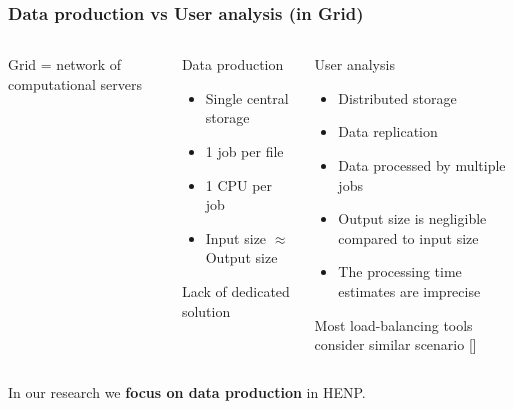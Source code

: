 \documentclass{beamer}
\begin{document}
\begin{frame}\frametitle{Data production vs User analysis (in Grid)}
\begin{columns}[c]
\begin{block}{}
Grid = network of computational servers
\end{block}

\begin{block}{Data production}
  \begin{itemize}
    \item Single central storage
    \item 1 job per file
    \item 1 CPU per job
    \item Input size $\approx$ Output size 
  \end{itemize}
  Lack of dedicated solution
\end{block}

\begin{block}{User analysis}
  \begin{itemize}
    \item Distributed storage	
    \item Data replication
	\item Data processed by multiple jobs
	\item Output size is negligible compared to input size
	\item The processing time estimates are imprecise  
  \end{itemize}
  Most load-balancing tools consider similar scenario \textcolor{black}{[\cite{Globus_scheduler}]}
\end{block}

\end{columns}


\begin{block}{}
In our research we \textbf{focus on data production} in HENP.
\end{block}
\end{frame}
\end{document}
